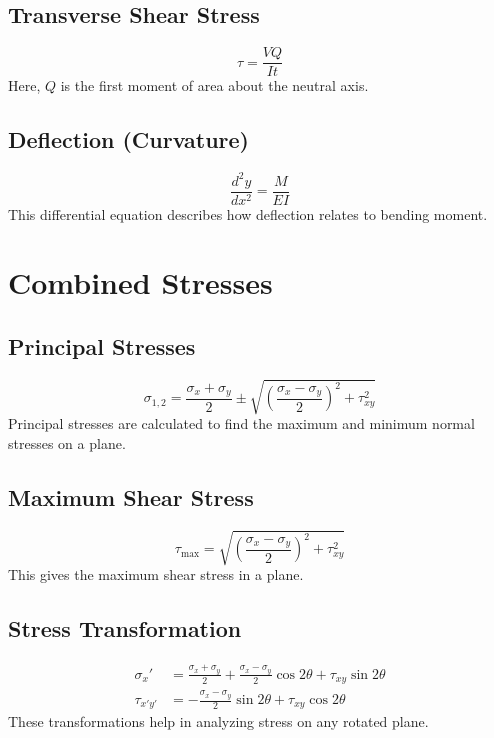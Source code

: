 \documentclass[12pt]{article}
\begin{document}
\subsection{Transverse Shear Stress}
\begin{equation}
\tau = \frac{VQ}{It}
\end{equation}
Here, $Q$ is the first moment of area about the neutral axis.

\subsection{Deflection (Curvature)}
\begin{equation}
\frac{d^2 y}{dx^2} = \frac{M}{E I}
\end{equation}
This differential equation describes how deflection relates to bending moment.

\section{Combined Stresses}
\subsection{Principal Stresses}
\begin{equation}
\sigma_{1,2} = \frac{\sigma_x + \sigma_y}{2} \pm \sqrt{\left(\frac{\sigma_x - \sigma_y}{2}\right)^2 + \tau_{xy}^2}
\end{equation}
Principal stresses are calculated to find the maximum and minimum normal stresses on a plane.

\subsection{Maximum Shear Stress}
\begin{equation}
\tau_{\text{max}} = \sqrt{\left(\frac{\sigma_x - \sigma_y}{2}\right)^2 + \tau_{xy}^2}
\end{equation}
This gives the maximum shear stress in a plane.

\subsection{Stress Transformation}
\begin{align}
\sigma_x' &= \frac{\sigma_x + \sigma_y}{2} + \frac{\sigma_x - \sigma_y}{2} \cos 2\theta + \tau_{xy} \sin 2\theta \\
\tau_{x'y'} &= -\frac{\sigma_x - \sigma_y}{2} \sin 2\theta + \tau_{xy} \cos 2\theta
\end{align}
These transformations help in analyzing stress on any rotated plane.
\end{document}
